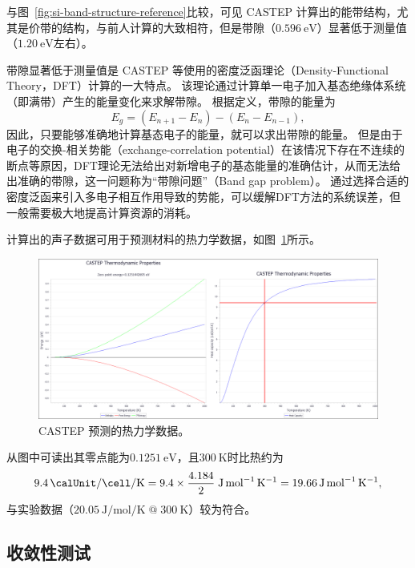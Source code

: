 与图~\ref{fig:si-band-structure-reference}比较，可见 CASTEP 计算出的能带结构，尤其是价带的结构，与前人计算的大致相符\cite{phillips_band_1962,cardona_energy_band_1966}，但是带隙（$\qty{0.596}{\electronvolt}$）显著低于测量值（$\qty{1.20}{\electronvolt}$左右）。

带隙显著低于测量值是 CASTEP 等使用的密度泛函理论（Density-Functional Theory，DFT）计算的一大特点。
该理论通过计算单一电子加入基态绝缘体系统（即满带）产生的能量变化来求解带隙。
根据定义，带隙的能量为
\begin{equation}
    E_g = (E_{n+1} - E_n) - (E_n - E_{n-1}),
\end{equation}
因此，只要能够准确地计算基态电子的能量，就可以求出带隙的能量。
但是由于电子的交换-相关势能（exchange-correlation potential）在该情况下存在不连续的断点等原因，DFT理论无法给出对新增电子的基态能量的准确估计，从而无法给出准确的带隙，这一问题称为“带隙问题”（Band gap problem）\cite{borlido_exchange-correlation_2020,sham_density-functional_1983}。
通过选择合适的密度泛函来引入多电子相互作用导致的势能，可以缓解DFT方法的系统误差，但一般需要极大地提高计算资源的消耗。

计算出的声子数据可用于预测材料的热力学数据，如图~\ref{fig:si-thermodynamics}所示。
\begin{figure}
    \centering
    \includegraphics[width=0.8\linewidth]{results/si-thermodynamics.png}
    \caption{CASTEP 预测的热力学数据。}
    \label{fig:si-thermodynamics}
\end{figure}
从图中可读出其零点能为$\qty{0.1251}{\electronvolt}$，且$\qty{300}{\kelvin}$时比热约为
\begin{equation}
    \qty{9.4}{\calUnit\per\cell\per\kelvin} = 9.4 \times \frac{4.184}{2} \; \unit{\joule\per\mole\per\kelvin} = \qty{19.66}{\joule\per\mole\per\kelvin},
\end{equation}
与实验数据（$\qty{20.05}{\joule\per\mole\per\kelvin} \; @ \; \qty{300}{\kelvin}$）较为符合。

\subsection{收敛性测试}

